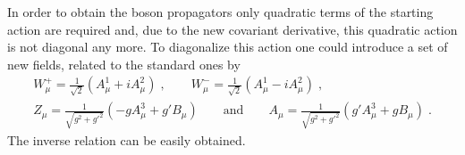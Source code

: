 In order to obtain the boson propagators only quadratic terms of the starting action are required and, due to the new covariant derivative, this quadratic action is not diagonal any more. To diagonalize this action one could introduce a set of new fields, related to the standard ones by
\begin{subequations} \begin{gather}
W^+_\mu = \frac{1}{\sqrt{2}} \left( A^1_\mu + iA^2_\mu \right) \;, \qquad W^-_\mu = \frac{1}{\sqrt{2}} \left( A^1_\mu - iA^2_\mu \right)  \;,
\label{ws} \\
Z_\mu =\frac{1}{\sqrt{g^2+g'^2} } \left(  -g A^3_\mu + g' B_\mu \right) \qquad \text{and}\qquad A_\mu =\frac{1}{\sqrt{g^2+g'^2} } \left(  g' A^3_\mu + gB_\mu \right) \;.
\label{za}
\end{gather} 
\end{subequations}
The inverse relation can be easily obtained.
